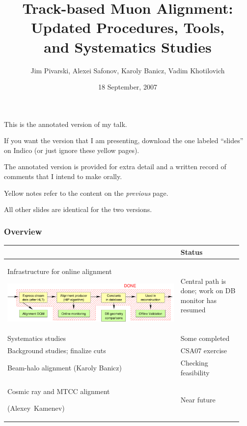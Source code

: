 \documentclass[compress]{beamer}
\title{Track-based Muon Alignment: \\ Updated Procedures, Tools, \\ and Systematics Studies}
\author{Jim Pivarski, Alexei Safonov, Karoly Banicz, Vadim Khotilovich}
\institute{Texas A\&M University}
\date{18 September, 2007}
\begin{document}
\frame{\titlepage}

\begin{notes}
\item This is the annotated version of my talk.
\item If you want the version that I am presenting, download the one
labeled ``slides'' on Indico (or just ignore these yellow pages).
\item The annotated version is provided for extra detail and a written
record of comments that I intend to make orally.
\item Yellow notes refer to the content on the {\it previous} page.
\item All other slides are identical for the two versions.
\end{notes}

\begin{frame}
\frametitle{Overview}
\vspace{-0.75 cm}
\renewcommand{\arraystretch}{1.6}
\begin{tabular}{p{0.7\linewidth} p{0.25\linewidth}}
& Status \\ \hline

Infrastructure for online alignment

\vspace{0.1 cm}
\includegraphics[width=\linewidth]{online_alignment.pdf} & Central path is done;
work on DB monitor has resumed \\

Systematics studies & Some completed \\

Background studies; finalize cuts & CSA07 exercise \\\hline

Beam-halo alignment (Karoly Banicz) & \mbox{Checking} \mbox{feasibility} \\ \hline

Cosmic ray and MTCC alignment

(Alexey~Kamenev) & Near future \\
\end{tabular}
\end{frame}
\end{document}
